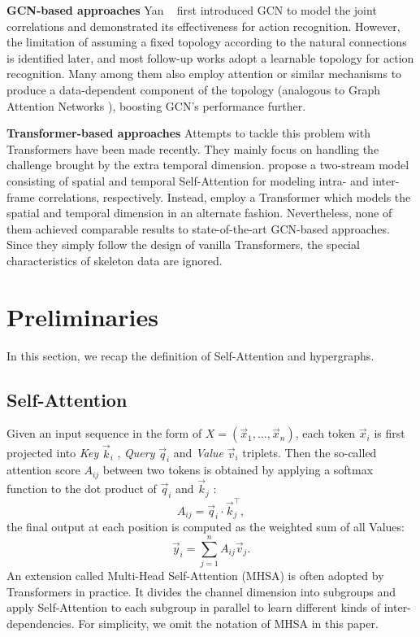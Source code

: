 \documentclass[10pt,twocolumn,letterpaper]{article}
\begin{document}
\textbf{GCN-based approaches}  Yan \etal~\cite{yan2018spatial} first introduced GCN \cite{kipf2016semi} to model the joint correlations and demonstrated its effectiveness for action recognition. However, 
the limitation of assuming a fixed topology according to the natural connections is identified later, and most follow-up works adopt a learnable topology for action recognition.
Many among them \cite{cheng2020decoupling, shi2019two, chen2021channel, ye2020dynamic} also employ attention or similar mechanisms to produce a data-dependent component of the  
topology (analogous to Graph Attention Networks \cite{velivckovic2017graph}), boosting GCN's performance further.

\textbf{Transformer-based approaches}
Attempts to tackle this problem with Transformers have been made recently.
They mainly focus on handling the challenge brought by the extra temporal dimension. 
\cite{plizzari2021spatial} propose a two-stream model consisting of spatial and temporal Self-Attention for modeling intra- and inter-frame correlations, respectively. Instead, \cite{shi2020decoupled} employ a Transformer which models the spatial and temporal dimension in an alternate fashion. 
Nevertheless, none of them achieved comparable results to state-of-the-art GCN-based approaches. Since they simply follow the design of vanilla Transformers, the special characteristics of skeleton data are ignored.

\section{Preliminaries}
In this section, we recap the definition of Self-Attention and hypergraphs.

\subsection{Self-Attention}






Given an input sequence in the form of $X=(\vec{x}_1,...,\vec{x}_n)$, each token $\vec{x}_i$ is first projected into \textit{Key} $\vec{k}_i$ , \textit{Query} $\vec{q}_i$  and \textit{Value} $\vec{v}_i$  triplets.
Then the so-called attention score $A_{ij}$ between two tokens is obtained by applying a softmax function to the dot product of $\vec{q}_i$ and $\vec{k}_j$ \cite{vaswani2017attention}:
\begin{equation}\label{eq:1} 
 A_{ij} = \vec{q}_i \cdot \vec{k}_j^\top,
\end{equation}
the final output at each position is computed as the weighted sum of all Values:
\begin{equation}
\label{eq:2}
\vec{y}_i = \sum_{j=1}^n A_{ij}\vec{v}_j
.
\end{equation}
An extension called Multi-Head Self-Attention (MHSA) is often adopted by Transformers in practice. It
divides the channel dimension into subgroups and apply Self-Attention to each subgroup in parallel to learn different kinds of inter-dependencies. For simplicity, we omit the notation of MHSA in this paper.
\end{document}
